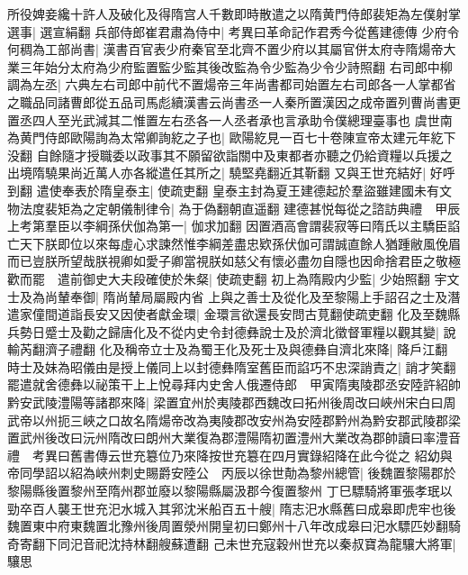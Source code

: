 所役婢妾纔十許人及破化及得隋宫人千數即時散遣之以隋黄門侍郎裴矩為左僕射掌選事|{
	選宣絹翻}
兵部侍郎崔君肅為侍中|{
	考異曰革命記作君秀今從舊建德傳}
少府令何稠為工部尚書|{
	漢書百官表少府秦官至北齊不置少府以其屬官併太府寺隋煬帝大業三年始分太府為少府監置監少監其後改監為令少監為少令少詩照翻}
右司郎中柳調為左丞|{
	六典左右司郎中前代不置煬帝三年尚書都司始置左右司郎各一人掌都省之職品同諸曹郎從五品司馬彪續漢書云尚書丞一人秦所置漢因之成帝置列曹尚書更置丞四人至光武減其二惟置左右丞各一人丞者承也言承助令僕總理臺事也}
虞世南為黄門侍郎歐陽詢為太常卿詢紇之子也|{
	歐陽紇見一百七十卷陳宣帝太建元年紇下没翻}
自餘隨才授職委以政事其不願留欲詣關中及東都者亦聽之仍給資糧以兵援之出境隋驍果尚近萬人亦各縱遣任其所之|{
	驍堅堯翻近其靳翻}
又與王世充結好|{
	好呼到翻}
遣使奉表於隋皇泰主|{
	使疏吏翻}
皇泰主封為夏王建德起於羣盜雖建國未有文物法度裴矩為之定朝儀制律令|{
	為于偽翻朝直遥翻}
建德甚悦每從之諮訪典禮　甲辰上考第羣臣以李綱孫伏伽為第一|{
	伽求加翻}
因置酒高會謂裴寂等曰隋氏以主驕臣諂亡天下朕即位以來每虛心求諫然惟李綱差盡忠欵孫伏伽可謂誠直餘人猶踵敝風俛眉而已豈朕所望哉朕視卿如愛子卿當視朕如慈父有懷必盡勿自隱也因命捨君臣之敬極歡而罷　遣前御史大夫段確使於朱粲|{
	使疏吏翻}
初上為隋殿内少監|{
	少始照翻}
宇文士及為尚輦奉御|{
	隋尚輦局屬殿内省}
上與之善士及從化及至黎陽上手詔召之士及潛遣家僮間道詣長安又因使者獻金環|{
	金環言欲還長安問古莧翻使疏吏翻}
化及至魏縣兵勢日蹙士及勸之歸唐化及不從内史令封德彝說士及於濟北徵督軍糧以觀其變|{
	說輸芮翻濟子禮翻}
化及稱帝立士及為蜀王化及死士及與德彝自濟北來降|{
	降戶江翻}
時士及妹為昭儀由是授上儀同上以封德彝隋室舊臣而諂巧不忠深誚責之|{
	誚才笑翻}
罷遣就舍德彝以祕策干上上悅尋拜内史舍人俄遷侍郎　甲寅隋夷陵郡丞安陸許紹帥黔安武陵澧陽等諸郡來降|{
	梁置宜州於夷陵郡西魏改曰拓州後周改曰峽州宋白曰周武帝以州扼三峽之口故名隋煬帝改為夷陵郡改安州為安陸郡黔州為黔安郡武陵郡梁置武州後改曰沅州隋改曰朗州大業復為郡澧陽隋初置澧州大業改為郡帥讀曰率澧音禮　考異曰舊書傳云世充簒位乃來降按世充簒在四月實錄紹降在此今從之}
紹幼與帝同學詔以紹為峽州刺史賜爵安陸公　丙辰以徐世勣為黎州總管|{
	後魏置黎陽郡於黎陽縣後置黎州至隋州郡並廢以黎陽縣屬汲郡今復置黎州}
丁巳驃騎將軍張孝珉以勁卒百人襲王世充汜水城入其郛沈米船百五十艘|{
	隋志汜水縣舊曰成皋即虎牢也後魏置東中府東魏置北豫州後周置滎州開皇初曰鄭州十八年改成皋曰汜水驃匹妙翻騎奇寄翻下同汜音祀沈持林翻艘蘇遭翻}
己未世充寇穀州世充以秦叔寶為龍驤大將軍|{
	驤思}



